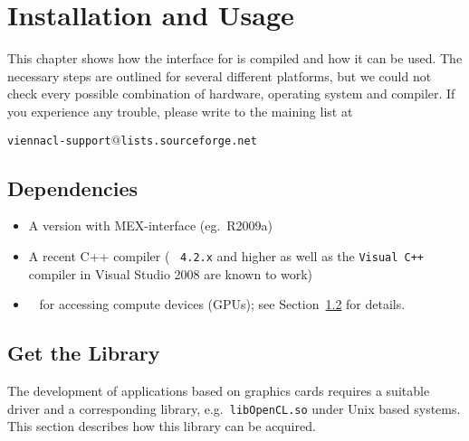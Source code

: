 \chapter{Installation and Usage}

This chapter shows how the {\MATLAB} interface for {\ViennaCL} is compiled and how it can be used. The necessary steps are outlined for several different platforms, but we could not check every possible combination of hardware, operating system and compiler. If you experience any trouble, please write to the maining list at \\
\begin{center}
\texttt{viennacl-support$@$lists.sourceforge.net} 
\end{center}


\section{Dependencies}
\label{dependencies}

\begin{itemize}
 \item A {\MATLAB} version with MEX-interface (eg.~R2009a)
 \item A recent C++ compiler (~{\GCC} \texttt{4.2.x} and higher as well as the \texttt{Visual C++} compiler in Visual Studio 2008 are known to work)
 \item {\OpenCL}~\cite{khronoscl,nvidiacl} for accessing compute devices (GPUs);
see Section~\ref{opencllibs} for details.
\end{itemize}

\section{Get the {\OpenCL} Library}
\label{opencllibs}
The development of {\OpenCL} applications based on graphics cards 
requires a suitable driver and a corresponding library, e.g.~\texttt{libOpenCL.so} under Unix based systems.
This section describes how this library can be acquired.

